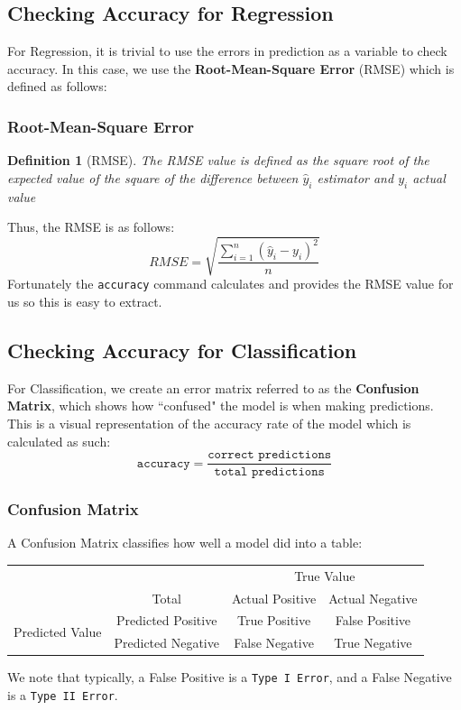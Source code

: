 \documentclass[11pt,a4paper]{report}
\newtheorem{definition}{Definition}
\begin{document}
\subsection{Checking Accuracy for Regression}
For Regression, it is trivial to use the errors in prediction as a variable to check accuracy.
In this case, we use the \textbf{Root-Mean-Square Error} (RMSE) which is defined as follows:
\subsubsection{Root-Mean-Square Error}
\begin{definition}[RMSE]
    The RMSE value is defined as the square root of the expected value of the square of the difference between $\hat{y}_i$ estimator and $y_i$ actual value 
\end{definition}
Thus, the RMSE is as follows:
\begin{equation}
    RMSE = \sqrt{\frac{\sum_{i=1}^{n} (\hat{y}_i - y_i)^2}{n}}
    \label{eq:RSME}
\end{equation}
Fortunately the \texttt{accuracy} command calculates and provides the RMSE value for us so this is easy to extract.

\subsection{Checking Accuracy for Classification}
For Classification, we create an error matrix referred to as the \textbf{Confusion Matrix}, which shows how ``confused" the model is when making predictions. 
This is a visual representation of the accuracy rate of the model which is calculated as such:
\begin{equation}
   \texttt{accuracy} = \frac{\texttt{correct predictions}}{\texttt{total predictions}}
   \label{eq:accuracy}
\end{equation}


\subsubsection{Confusion Matrix}
A Confusion Matrix classifies how well a model did into a table:
\begin{center}
\begin{tabular}{|c|c|c|c|}
    \cline{3-4}
    \multicolumn{2}{c}{} & \multicolumn{2}{|c|}{True Value}\\
    \cline{2-4}
    \multicolumn{1}{c|}{} & Total &  Actual Positive & Actual Negative \\ 
    \hline
    \multirow{2}{*}{Predicted Value} & Predicted Positive & \cellcolor{green} True Positive & \cellcolor{red} False Positive \\ 
    \cline{2-4}
    & Predicted Negative &  \cellcolor{red} False Negative & \cellcolor{green} True Negative\\
    \hline
\end{tabular}
\end{center}
We note that typically, a {\color{red} False Positive} is a \texttt{Type I Error}, and a {\color{red} False Negative} is a \texttt{Type II Error}.
\end{document}
